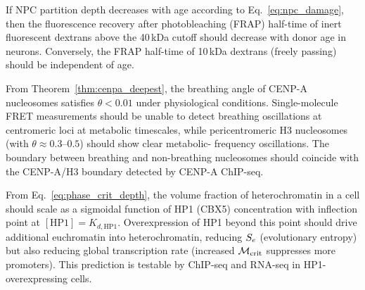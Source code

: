 \begin{proposition}
\label{prop:npc_frap}
If NPC partition depth decreases with age according to Eq.~\eqref{eq:npc_damage},
then the fluorescence recovery after photobleaching (FRAP) half-time of
inert fluorescent dextrans above the 40\,kDa cutoff should decrease with
donor age in neurons. Conversely, the FRAP half-time of 10\,kDa dextrans
(freely passing) should be independent of age.
\end{proposition}

\begin{proposition}
\label{prop:cenpa_breathing}
From Theorem~\ref{thm:cenpa_deepest}, the breathing angle of CENP-A
nucleosomes satisfies $\theta < 0.01$ under physiological conditions.
Single-molecule FRET measurements should be unable to detect breathing
oscillations at centromeric loci at metabolic timescales, while pericentromeric
H3 nucleosomes (with $\theta \approx 0.3$--$0.5$) should show clear metabolic-
frequency oscillations. The boundary between breathing and non-breathing
nucleosomes should coincide with the CENP-A/H3 boundary detected by CENP-A
ChIP-seq.
\end{proposition}

\begin{proposition}
\label{prop:phase_sep_hp1}
From Eq.~\eqref{eq:phase_crit_depth}, the volume fraction of heterochromatin
in a cell should scale as a sigmoidal function of HP1 (CBX5) concentration
with inflection point at $[\mathrm{HP1}] = K_{d,\mathrm{HP1}}$. Overexpression
of HP1 beyond this point should drive additional euchromatin into
heterochromatin, reducing $S_e$ (evolutionary entropy) but also reducing
global transcription rate (increased $\mathcal{M}_{\mathrm{crit}}$ suppresses more
promoters). This prediction is testable by ChIP-seq and RNA-seq in HP1-
overexpressing cells.
\end{proposition}

